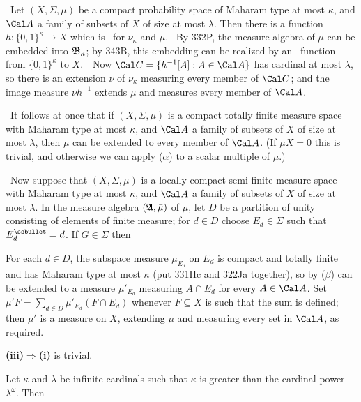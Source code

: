 {\medskip

\quad\grheada\ Let $(X,\Sigma,\mu)$ be a compact probability space of
Maharam
type at most $\kappa$, and $\Cal A$ a family of subsets of $X$ of size at
most $\lambda$.   Then there is a function $h:\{0,1\}^{\kappa}\to X$ which
is \imp\ for $\nu_{\kappa}$ and $\mu$.   \Prf\ By 332P, the measure algebra
of $\mu$ can be embedded into $\frak B_{\kappa}$;  by 343B, this embedding
can be realized by an \imp\ function from $\{0,1\}^{\kappa}$ to $X$.\ \QeD\
Now $\Cal C=\{h^{-1}[A]:A\in\Cal A\}$ has cardinal at most $\lambda$,
so there is
an extension $\nu$ of $\nu_{\kappa}$ measuring every member of $\Cal C$;
and the image measure $\nu h^{-1}$ extends $\mu$ and measures every member
of $\Cal A$.

\medskip

\quad\grheadb\ It follows at once that if $(X,\Sigma,\mu)$ is a compact
totally finite measure space with Maharam
type at most $\kappa$, and $\Cal A$ a family of subsets of $X$ of size at
most $\lambda$, then $\mu$ can be extended to every member of $\Cal A$.
(If $\mu X=0$ this is trivial, and otherwise we can apply ($\alpha$) to a
scalar multiple of $\mu$.)

\medskip

\quad\grheadc\ Now suppose that $(X,\Sigma,\mu)$ is a locally compact
semi-finite measure space with Maharam
type at most $\kappa$, and $\Cal A$ a family of subsets of $X$ of size at
most $\lambda$.   In the measure algebra $(\frak A,\bar\mu)$ of $\mu$,
let $D$ be a
partition of unity consisting of elements of finite measure;  for $d\in D$
choose $E_d\in\Sigma$ such that $E_d^{\ssbullet}=d$.   If $G\in\Sigma$ then


\noindent For each $d\in D$, the subspace measure $\mu_{E_d}$ on $E_d$ is
compact and totally finite and has Maharam type at most $\kappa$ (put
331Hc and 322Ja together),
so by ($\beta$) can be extended to a measure
$\mu'_{E_d}$ measuring $A\cap E_d$ for every $A\in\Cal A$.   Set
$\mu'F=\sum_{d\in D}\mu'_{E_d}(F\cap E_d)$ whenever $F\subseteq X$ is such
that the sum is defined;  then $\mu'$ is a measure on $X$, extending $\mu$
and measuring every set in $\Cal A$, as required.

\medskip

{\bf (iii)$\Rightarrow$(i)} is trivial.
}%

 Let $\kappa$ and
$\lambda$ be infinite cardinals such that $\kappa$ is greater than the
cardinal power $\lambda^{\omega}$.   Then


